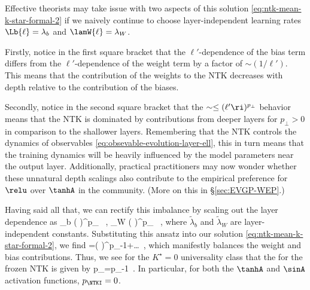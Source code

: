 Effective theorists may take issue with two aspects of this solution 
\eqref{eq:ntk-mean-k-star-formal-2} 
if we naively continue to choose layer-independent learning rates $\Lb{\ell}=\lambda_b$ and $\lamW{\ell}=\lambda_W$.
\bi
\item Firstly, notice in the first square bracket that the $\ell'$-dependence of the bias term differs from the $\ell'$-dependence of the weight term by a factor of $\sim (1/\ell')$. This means that the contribution of the weights to the NTK decreases with depth relative to the contribution of the biases.
\item Secondly, notice in the second square bracket that the $\sim\le(\ell'\ri)^{p_\perp}$ behavior means that the NTK is dominated by contributions from deeper layers for $p_\perp > 0$ in comparison to the shallower layers. Remembering that the NTK controls the dynamics of observables \eqref{eq:obsevable-evolution-layer-ell}, this in turn means that the training dynamics %
will be heavily influenced by the model parameters near the output layer.
\ei
Additionally, practical practitioners may now wonder whether these unnatural depth scalings also contribute to the empirical preference for $\relu$ over $\tanhA$ in the  community. (More on this in \S\ref{sec:EVGP-WEP}.)





Having said all that, we can rectify this
imbalance by scaling out the layer dependence as
\be\label{eq:layer-independent-rates}
\Lb{\ell} \equiv \widetilde{\lambda}_b \le( \ri)^{p_\perp} \, , \qquad \LW{\ell} \equiv \widetilde{\lambda}_W \le( \ri)^{p_} \, ,
\ee
where $\widetilde{\lambda}_b$ and $\widetilde{\lambda}_W$ are layer-independent constants.
Substituting this ansatz into our solution \eqref{eq:ntk-mean-k-star-formal-2}, we find
\be\label{eq:frozen-ntk-k-star-solution}
\Ti{\NTKI}{}{\ell}=\le( \ri)^{p_{\perp}-1}+\ldots\, ,
\ee
which manifestly balances the weight and bias contributions.
Thus, we see for the $K^\star=0$ universality class that the  for the frozen NTK is given by
\be\label{eq:frozen-ntk-k-star-critical-exponent}
p_{\NTKI}=p_{\perp}-1\, .
\ee
In particular, for both the $\tanhA$ and $\sinA$ activation functions,
$p_{\NTKI}=0$. 



